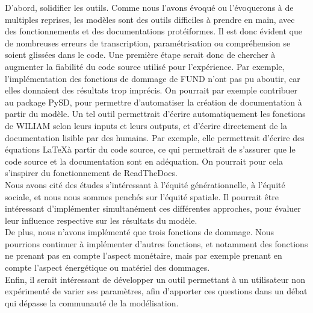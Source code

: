 D'abord, solidifier les outils. Comme nous l'avons évoqué ou l'évoquerons à de multiples reprises, les modèles sont des outils difficiles à prendre en main, avec des fonctionnements et des documentations protéiformes. Il est donc évident que de nombreuses erreurs de transcription, paramétrisation ou compréhension se soient glissées dans le code. Une première étape serait donc de chercher à augmenter la fiabilité du code source utilisé pour l'expérience. Par exemple, l'implémentation des fonctions de dommage de FUND n'ont pas pu aboutir, car elles donnaient des résultats trop imprécis. On pourrait par exemple contribuer au package PySD, pour permettre d'automatiser la création de documentation à partir du modèle. Un tel outil permettrait d'écrire automatiquement les fonctions de WILIAM selon leurs inputs et leurs outputs, et d'écrire directement de la documentation lisible par des humains. Par exemple, elle permettrait d'écrire des équations \LaTeX à partir du code source, ce qui permettrait de s'assurer que le code source et la documentation sont en adéquation. On pourrait pour cela s'inspirer du fonctionnement de ReadTheDocs. \\

Nous avons cité des études s'intéressant à l'équité générationnelle, à l'équité sociale, et nous nous sommes penchés sur l'équité spatiale. Il pourrait être intéressant d'implémenter simultanément ces différentes approches, pour évaluer leur influence respective sur les résultats du modèle. \\

De plus, nous n'avons implémenté que trois fonctions de dommage. Nous pourrions continuer à implémenter d'autres fonctions, et notamment des fonctions ne prenant pas en compte l'aspect monétaire, mais par exemple prenant en compte l'aspect énergétique ou matériel des dommages. \\

Enfin, il serait intéressant de développer un outil permettant à un utilisateur non expérimenté de varier ses paramètres, afin d'apporter ces questions dans un débat qui dépasse la communauté de la modélisation. 